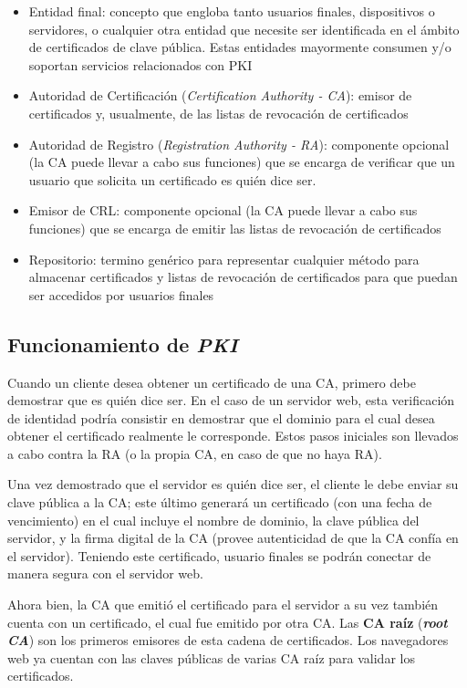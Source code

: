 \begin{itemize}
    \item Entidad final: concepto que engloba tanto usuarios finales, dispositivos o servidores, o cualquier otra entidad que necesite ser identificada en el ámbito de certificados de clave pública. Estas entidades mayormente consumen y/o soportan servicios relacionados con PKI
    \item Autoridad de Certificación (\emph{Certification Authority - CA}): emisor de certificados y, usualmente, de las listas de revocación de certificados
    \item Autoridad de Registro (\emph{Registration Authority - RA}): componente opcional (la CA puede llevar a cabo sus funciones) que se encarga de verificar que un usuario que solicita un certificado es quién dice ser.
    \item Emisor de CRL: componente opcional (la CA puede llevar a cabo sus funciones) que se encarga de emitir las listas de revocación de certificados
    \item Repositorio: termino genérico para representar cualquier método para almacenar certificados y listas de revocación de certificados para que puedan ser accedidos por usuarios finales
\end{itemize}

\subsection{Funcionamiento de \emph{PKI}}

Cuando un cliente desea obtener un certificado de una CA, primero debe demostrar que es quién dice ser. En el caso de un servidor web, esta verificación de identidad podría consistir en demostrar que el dominio para el cual desea obtener el certificado realmente le corresponde. Estos pasos iniciales son llevados a cabo contra la RA (o la propia CA, en caso de que no haya RA).

Una vez demostrado que el servidor es quién dice ser, el cliente le debe enviar su clave pública a la CA; este último generará un certificado (con una fecha de vencimiento) en el cual incluye el nombre de dominio, la clave pública del servidor, y la firma digital de la CA (provee autenticidad de que la CA confía en el servidor). Teniendo este certificado, usuario finales se podrán conectar de manera segura con el servidor web.

Ahora bien, la CA que emitió el certificado para el servidor a su vez también cuenta con un certificado, el cual fue emitido por otra CA. Las \textbf{CA raíz} (\textbf{\emph{root CA}}) son los primeros emisores de esta cadena de certificados. Los navegadores web ya cuentan con las claves públicas de varias CA raíz para validar los certificados. 

